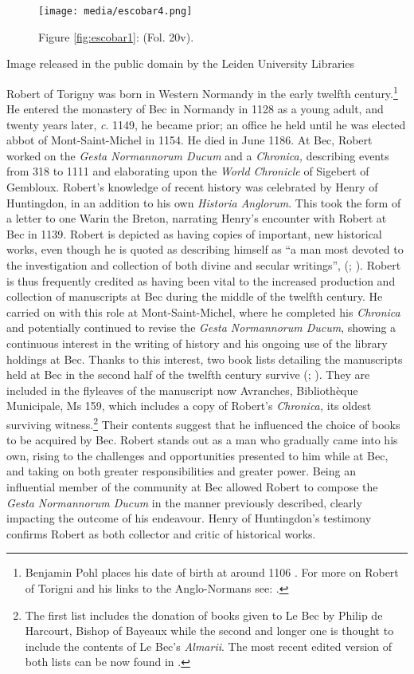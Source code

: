 \documentclass{article}
\begin{document}
\begin{figure}[H]
  \centering
  \texttt{[image: media/escobar4.png]}
    \caption{Figure \ref{fig:escobar1}: (Fol. 20v).}
    \label{fig:escobar4}
  \end{figure}

 Image released in the public domain by the Leiden University Libraries 

  
Robert of Torigny was born in Western Normandy in the early twelfth
century.\footnote{Benjamin Pohl places his date of birth at around 1106 
  \citep[112]{pohl_robert_2018}. For more on Robert of Torigni and his links to the
  Anglo-Normans see: \cite{bates_robert_2012}.} He entered the monastery of Bec in
Normandy in 1128 as a young adult, and twenty years later, \emph{c}.
1149, he became prior; an office he held until he was elected
abbot of Mont-Saint-Michel in 1154. He died in June 1186. At Bec, Robert worked
on the \emph{Gesta Normannorum Ducum} and a \emph{Chronica,} describing
events from 318 to 1111 and elaborating upon the \emph{World Chronicle}
of Sigebert of Gembloux. Robert's knowledge of recent history was
celebrated by Henry of Huntingdon, in an addition to his own
\emph{Historia Anglorum}. This took the form of a letter to one Warin
the Breton, narrating Henry's encounter with Robert at Bec in 1139.
Robert is depicted as having copies of important, new historical works,
even though he is quoted as describing himself as ``a man most devoted to
the investigation and collection of both divine and secular writings'',
(\cite[lxxviii]{van_houts_gesta_1992}; \cite[98]{pohl_robert_2018}). Robert is thus frequently
credited as having been vital to the increased production and collection
of manuscripts at Bec during the middle of the twelfth century. He
carried on with this role at Mont-Saint-Michel, where he completed his
\emph{Chronica} and potentially continued to revise the \emph{Gesta
Normannorum Ducum}, showing a continuous interest in the writing of
history and his ongoing use of the library holdings at Bec. Thanks to
this interest, two book lists detailing the manuscripts held at Bec in
the second half of the twelfth century survive (\cite{pohl_monastic_2017}; \cite[51]{pohl_abbas_2014}). They are included in the flyleaves of the manuscript now Avranches,
Bibliothèque Municipale, Ms 159, which includes a copy of Robert's
\emph{Chronica,} its oldest surviving witness.\footnote{The first list
  includes the donation of books given to Le Bec by Philip de Harcourt,
  Bishop of Bayeaux while the second and longer one is thought to
  include the contents of Le Bec's \emph{Almarii}. The most recent
  edited version of both lists can be now found in \cite{pohl_monastic_2017}.}
Their contents suggest that he influenced the choice of books to be
acquired by Bec. Robert stands out as a man who gradually came into his
own, rising to the challenges and opportunities presented to him while
at Bec, and taking on both greater responsibilities and greater power.
Being an influential member of the community at Bec allowed Robert to
compose the \emph{Gesta Normannorum Ducum} in the manner previously
described, clearly impacting the outcome of his endeavour. Henry of
Huntingdon's testimony confirms Robert as both collector and critic of
historical works.
\end{document}
